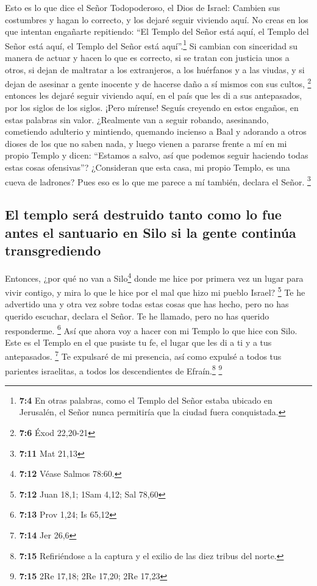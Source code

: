  Esto es lo que dice el Señor Todopoderoso, el Dios de
Israel: Cambien sus costumbres y hagan lo correcto, y los dejaré seguir
viviendo aquí.  No creas en los que intentan engañarte
repitiendo: ``El Templo del Señor está aquí, el Templo del Señor está
aquí, el Templo del Señor está aquí''.\footnote{\textbf{7:4} En otras
  palabras, como el Templo del Señor estaba ubicado en Jerusalén, el
  Señor nunca permitiría que la ciudad fuera conquistada.}
 Si cambian con sinceridad su manera de actuar y hacen lo
que es correcto, si se tratan con justicia unos a otros, 
si dejan de maltratar a los extranjeros, a los huérfanos y a las viudas,
y si dejan de asesinar a gente inocente y de hacerse daño a sí mismos
con sus cultos, \footnote{\textbf{7:6} Éxod 22,20-21} 
entonces les dejaré seguir viviendo aquí, en el país que les di a sus
antepasados, por los siglos de los siglos.  ¡Pero mírense!
Seguís creyendo en estos engaños, en estas palabras sin valor.
 ¿Realmente van a seguir robando, asesinando, cometiendo
adulterio y mintiendo, quemando incienso a Baal y adorando a otros
dioses de los que no saben nada,  y luego vienen a
pararse frente a mí en mi propio Templo y dicen: ``Estamos a salvo, así
que podemos seguir haciendo todas estas cosas ofensivas''?
 ¿Consideran que esta casa, mi propio Templo, es una
cueva de ladrones? Pues eso es lo que me parece a mí también, declara el
Señor. \footnote{\textbf{7:11} Mat 21,13}

\hypertarget{el-templo-seruxe1-destruido-tanto-como-lo-fue-antes-el-santuario-en-silo-si-la-gente-continuxfaa-transgrediendo}{%
\subsection{El templo será destruido tanto como lo fue antes el
santuario en Silo si la gente continúa
transgrediendo}\label{el-templo-seruxe1-destruido-tanto-como-lo-fue-antes-el-santuario-en-silo-si-la-gente-continuxfaa-transgrediendo}}

 Entonces, ¿por qué no van a Silo\footnote{\textbf{7:12}
  Véase Salmos 78:60.} donde me hice por primera vez un lugar para vivir
contigo, y mira lo que le hice por el mal que hizo mi pueblo Israel?
\footnote{\textbf{7:12} Juan 18,1; 1Sam 4,12; Sal 78,60} 
Te he advertido una y otra vez sobre todas estas cosas que has hecho,
pero no has querido escuchar, declara el Señor. Te he llamado, pero no
has querido responderme. \footnote{\textbf{7:13} Prov 1,24; Is 65,12}
 Así que ahora voy a hacer con mi Templo lo que hice con
Silo. Este es el Templo en el que pusiste tu fe, el lugar que les di a
ti y a tus antepasados. \footnote{\textbf{7:14} Jer 26,6}
 Te expulsaré de mi presencia, así como expulsé a todos
tus parientes israelitas, a todos los descendientes de
Efraín.\footnote{\textbf{7:15} Refiriéndose a la captura y el exilio de
  las diez tribus del norte.} \footnote{\textbf{7:15} 2Re 17,18; 2Re
  17,20; 2Re 17,23}

